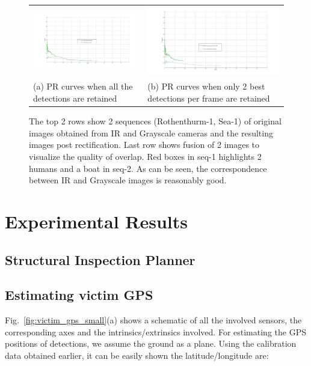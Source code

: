 \documentclass[runningheads]{llncs}
\begin{document}
\begin{figure}
  \centering
  \begin{tabular}{m{5cm}m{5cm}}
  	\includegraphics[width=6cm]{img/fusion/Roth/PR-roth-all-detections.jpg} &
  	\includegraphics[width=6cm]{img/fusion/Roth/PR-roth-top-detections.jpg} \\
  	\small (a) PR curves when all the detections are retained &
  	\small (b) PR curves when only 2 best detections per frame are retained
  \end{tabular}

  \caption{The top 2 rows show 2 sequences (Rothenthurm-1, Sea-1) of original images obtained from IR and Grayscale cameras and the resulting images post rectification. Last row shows fusion of 2 images to visualize the quality of overlap. Red boxes in seq-1 highlights 2 humans and a boat in seq-2. As can be seen, the correspondence between IR and Grayscale images is reasonably good.}\label{fig:fusion}
\end{figure}


\section{Experimental Results}

\subsection{Structural Inspection Planner}

\subsection{Estimating victim GPS}

Fig.~\ref{fig:victim_gps_small}(a) shows a schematic of all the involved sensors, the corresponding axes and the intrinsics/extrinsics involved. For estimating the GPS positions of detections, we assume the ground as a plane. Using the calibration data obtained earlier, it can be easily shown the latitude/longitude are:
\end{document}
